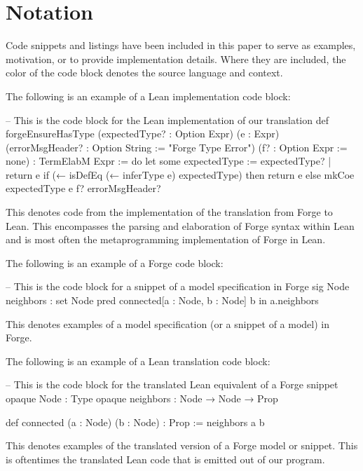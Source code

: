 


\newpage
{
  \hypersetup{linkcolor=black}
  \tableofcontents
}

\newpage
\section*{Notation}

Code snippets and listings have been included in this paper to serve as examples, motivation, or to provide implementation details. Where they are included, the color of the code block denotes the source language and context. 

The following is an example of a Lean implementation code block:
\begin{leanimpl}
-- This is the code block for the Lean implementation of our translation
def forgeEnsureHasType (expectedType? : Option Expr) (e : Expr)
    (errorMsgHeader? : Option String := "Forge Type Error") 
    (f? : Option Expr := none) : TermElabM Expr := do
  let some expectedType := expectedType? | return e
  if (← isDefEq (← inferType e) expectedType) then
    return e
  else
    mkCoe expectedType e f? errorMsgHeader?
\end{leanimpl}
This denotes code from the implementation of the translation from Forge to Lean. This encompasses the parsing and elaboration of Forge syntax within Lean and is most often the metaprogramming implementation of Forge in Lean. 

The following is an example of a Forge code block: 
\begin{forge}
-- This is the code block for a snippet of a model specification in Forge
sig Node {
  neighbors : set Node
}
pred connected[a : Node, b : Node] {
  b in a.neighbors
}
\end{forge}
This denotes examples of a model specification (or a snippet of a model) in Forge. 

The following is an example of a Lean translation code block:
\begin{lean}
-- This is the code block for the translated Lean equivalent of a Forge snippet
opaque Node : Type
opaque neighbors : Node → Node → Prop

def connected (a : Node) (b : Node) : Prop :=
  neighbors a b
\end{lean}
This denotes examples of the translated version of a Forge model or snippet. This is oftentimes the translated Lean code that is emitted out of our program. 